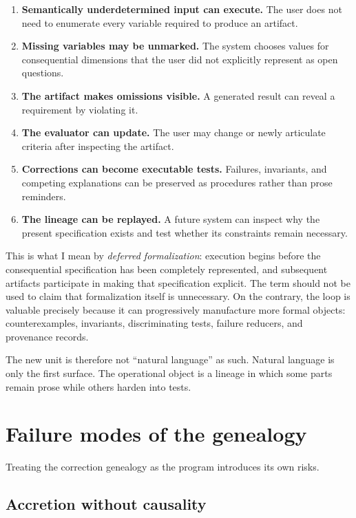\documentclass[11pt]{article}
\begin{document}
\begin{enumerate}
  \item \textbf{Semantically underdetermined input can execute.} The user does not need to enumerate every variable required to produce an artifact.
  \item \textbf{Missing variables may be unmarked.} The system chooses values for consequential dimensions that the user did not explicitly represent as open questions.
  \item \textbf{The artifact makes omissions visible.} A generated result can reveal a requirement by violating it.
  \item \textbf{The evaluator can update.} The user may change or newly articulate criteria after inspecting the artifact.
  \item \textbf{Corrections can become executable tests.} Failures, invariants, and competing explanations can be preserved as procedures rather than prose reminders.
  \item \textbf{The lineage can be replayed.} A future system can inspect why the present specification exists and test whether its constraints remain necessary.
\end{enumerate}

This is what I mean by \emph{deferred formalization}: execution begins before the consequential specification has been completely represented, and subsequent artifacts participate in making that specification explicit. The term should not be used to claim that formalization itself is unnecessary. On the contrary, the loop is valuable precisely because it can progressively manufacture more formal objects: counterexamples, invariants, discriminating tests, failure reducers, and provenance records.

The new unit is therefore not ``natural language'' as such. Natural language is only the first surface. The operational object is a lineage in which some parts remain prose while others harden into tests.

\section{Failure modes of the genealogy}

Treating the correction genealogy as the program introduces its own risks.

\subsection{Accretion without causality}
\end{document}
